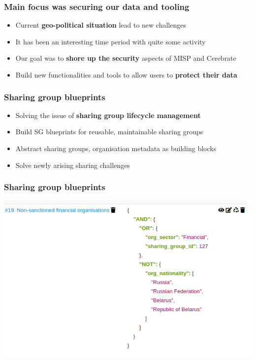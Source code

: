 \begin{frame}
  \frametitle{Main focus was securing our data and tooling}
  \begin{itemize}
      \item Current {\bf geo-political situation} lead to new challenges
      \item It has been an interesting time period with quite some activity
      \item Our goal was to {\bf shore up the security} aspects of MISP and Cerebrate
      \item Build new functionalities and tools to allow users to {\bf protect their data}
  \end{itemize}
\end{frame}

\begin{frame}
  \frametitle{Sharing group blueprints}
  \begin{itemize}
     \item Solving the issue of {\bf sharing group lifecycle management}
     \item Build SG blueprints for reusable, maintainable sharing groups
     \item Abstract sharing groups, organisation metadata as building blocks
     \item Solve newly arising sharing challenges
  \end{itemize}
\end{frame}

\begin{frame}
\frametitle{Sharing group blueprints}
\includegraphics[scale=0.6]{images/blueprints2.png}
\end{frame}

